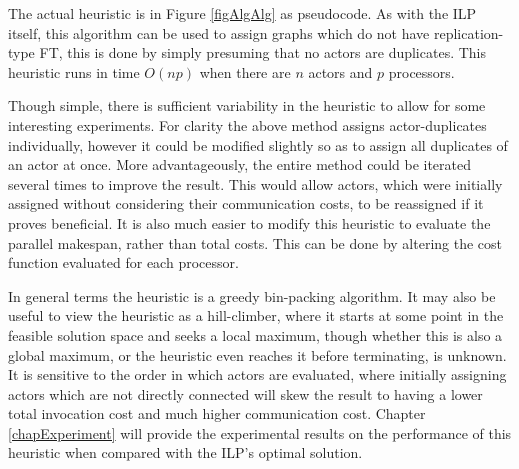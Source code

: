 The actual heuristic is in Figure \ref{figAlgAlg} as pseudocode.
As with the ILP itself, this algorithm can be used to assign graphs which do not have replication-type FT, this is done by simply presuming that no actors are duplicates.
This heuristic runs in time $O(np)$ when there are $n$ actors and $p$ processors.

Though simple, there is sufficient variability in the heuristic to allow for some interesting experiments.
For clarity the above method assigns actor-duplicates individually, however it could be modified slightly so as to assign all duplicates of an actor at once.
More advantageously, the entire method could be iterated several times to improve the result.
This would allow actors, which were initially assigned without considering their communication costs, to be reassigned if it proves beneficial.
It is also much easier to modify this heuristic to evaluate the parallel makespan, rather than total costs.
This can be done by altering the cost function evaluated for each processor.

In general terms the heuristic is a greedy bin-packing algorithm.
It may also be useful to view the heuristic as a hill-climber, where it starts at some point in the feasible solution space and seeks a local maximum, though whether this is also a global maximum, or the heuristic even reaches it before terminating, is unknown.
It is sensitive to the order in which actors are evaluated, where initially assigning actors which are not directly connected will skew the result to having a lower total invocation cost and much higher communication cost.
Chapter \ref{chapExperiment} will provide the experimental results on the performance of this heuristic when compared with the ILP's optimal solution.
